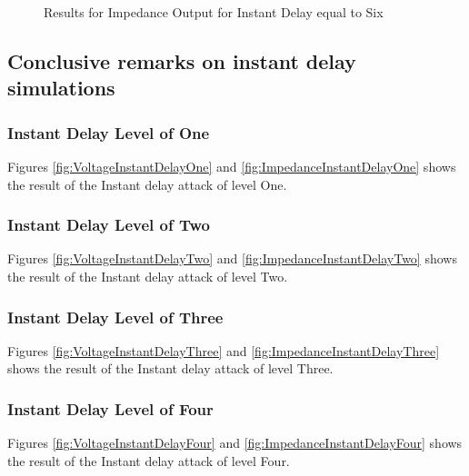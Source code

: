 \begin{figure}[H]
\begin{tabular}{c}
 
  \end{tabular}
\caption{Results for Impedance Output for Instant Delay equal to Six }
\label{fig:ImpedanceInstantDelaySix}
		  \end{figure}

\newpage
\subsection{Conclusive remarks on instant delay simulations}


\subsubsection{Instant Delay Level of One}
Figures \ref{fig:VoltageInstantDelayOne} and \ref{fig:ImpedanceInstantDelayOne} shows the result of the Instant delay attack of level One. 

\subsubsection{Instant Delay Level of Two}
Figures \ref{fig:VoltageInstantDelayTwo} and \ref{fig:ImpedanceInstantDelayTwo} shows the result of the Instant delay attack of level Two. 

\subsubsection{Instant Delay Level of Three}
Figures \ref{fig:VoltageInstantDelayThree} and \ref{fig:ImpedanceInstantDelayThree} shows the result of the Instant delay attack of level Three. 

\subsubsection{Instant Delay Level of Four}
Figures \ref{fig:VoltageInstantDelayFour} and \ref{fig:ImpedanceInstantDelayFour} shows the result of the Instant delay attack of level Four. 

